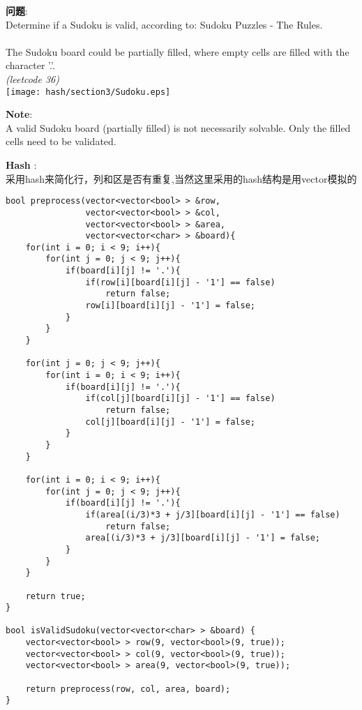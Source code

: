     
\begin{description}
    \item{\textbf{问题}}:\\
Determine if a Sudoku is valid, according to: Sudoku Puzzles - The Rules.\\
\\
The Sudoku board could be partially filled, where empty cells are filled with the character '.'.\\
\textit{(leetcode 36)}\\
\texttt{[image: hash/section3/Sudoku.eps]}
    \item{\textbf{Note}}:\\
A valid Sudoku board (partially filled) is not necessarily solvable. Only the filled cells need to be validated.
    \item{\textbf{Hash}} : 
    \\采用hash来简化行，列和区是否有重复,当然这里采用的hash结构是用vector模拟的
    \begin{lstlisting}
bool preprocess(vector<vector<bool> > &row,
				vector<vector<bool> > &col,
				vector<vector<bool> > &area,
				vector<vector<char> > &board){
	for(int i = 0; i < 9; i++){
		for(int j = 0; j < 9; j++){
			if(board[i][j] != '.'){
				if(row[i][board[i][j] - '1'] == false)
					return false;
				row[i][board[i][j] - '1'] = false;
			}
		}
	}

	for(int j = 0; j < 9; j++){
		for(int i = 0; i < 9; i++){
			if(board[i][j] != '.'){
				if(col[j][board[i][j] - '1'] == false)
					return false;
				col[j][board[i][j] - '1'] = false;
			}
		}
	}

	for(int i = 0; i < 9; i++){
		for(int j = 0; j < 9; j++){
			if(board[i][j] != '.'){
				if(area[(i/3)*3 + j/3][board[i][j] - '1'] == false)
					return false;
				area[(i/3)*3 + j/3][board[i][j] - '1'] = false;
			}
		}
	}

	return true;
}

bool isValidSudoku(vector<vector<char> > &board) {
	vector<vector<bool> > row(9, vector<bool>(9, true));
	vector<vector<bool> > col(9, vector<bool>(9, true));
	vector<vector<bool> > area(9, vector<bool>(9, true));

	return preprocess(row, col, area, board);
}
    \end{lstlisting}
\end{description}
